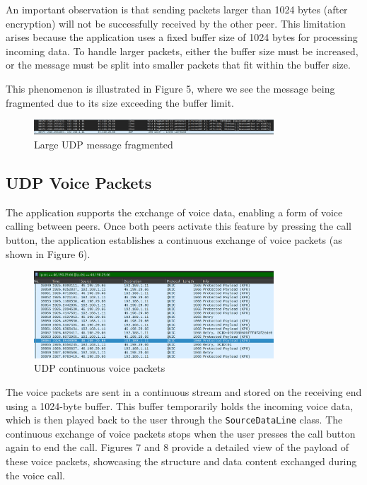 \documentclass{article}
\begin{document}
\newpage An important observation is that sending packets larger than 1024 bytes (after encryption) will not be successfully received by the other peer. This limitation arises because the application uses a fixed buffer size of 1024 bytes for processing incoming data. To handle larger packets, either the buffer size must be increased, or the message must be split into smaller packets that fit within the buffer size.

This phenomenon is illustrated in Figure 5, where we see the message being fragmented due to its size exceeding the buffer limit. 


\begin{figure}[h!]
    \centering
    \includegraphics[width=0.8\textwidth]{udp-messages-fragmented.png}
    \caption{Large UDP message fragmented}
    \label{fig:udp-messages-4}
\end{figure}

\subsection{UDP Voice Packets}

The application supports the exchange of voice data, enabling a form of voice calling between peers. Once both peers activate this feature by pressing the call button, the application establishes a continuous exchange of voice packets (as shown in Figure 6).

\begin{figure}[h!]
    \centering
    \includegraphics[width=0.8\textwidth]{udp-voice-1.png}
    \caption{UDP continuous voice packets}
    \label{fig:udp-voice-1}
\end{figure}

The voice packets are sent in a continuous stream and stored on the receiving end using a 1024-byte buffer. This buffer temporarily holds the incoming voice data, which is then played back to the user through the \texttt{SourceDataLine} class. The continuous exchange of voice packets stops when the user presses the call button again to end the call. Figures 7 and 8 provide a detailed view of the payload of these voice packets, showcasing the structure and data content exchanged during the voice call.
\end{document}
